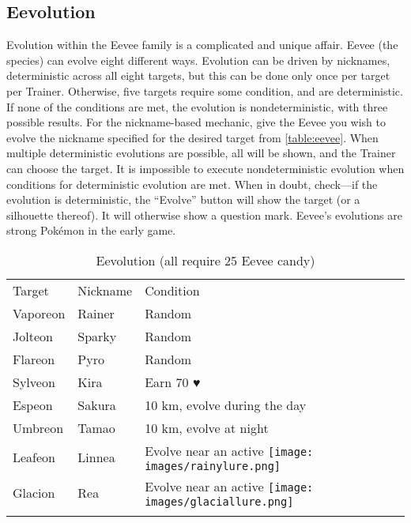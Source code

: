 \subsection{Eevolution}
\begin{figure}
\end{figure}
Evolution within the Eevee family is a complicated and unique affair.
Eevee (the species) can evolve eight different ways.
Evolution can be driven by nicknames, deterministic across all eight targets,
  but this can be done only once per target per Trainer.
Otherwise, five targets require some condition, and are deterministic.
If none of the conditions are met, the evolution is nondeterministic,
  with three possible results.
For the nickname-based mechanic, give the Eevee you wish to evolve the nickname
  specified for the desired target from \autoref{table:eevee}.
When multiple deterministic evolutions are possible, all will be shown,
  and the Trainer can choose the target.
It is impossible to execute nondeterministic evolution when conditions for deterministic evolution are met.
When in doubt, check---if the evolution is deterministic, the ``Evolve'' button will show the target (or a silhouette thereof).
It will otherwise show a question mark.
Eevee's evolutions are strong Pokémon in the early game.
\begin{table}
\centering
\begin{tabular}{lll}
  Target & Nickname & Condition\\
  \Midrule
  Vaporeon & Rainer & Random\\
  Jolteon & Sparky & Random\\
  Flareon & Pyro & Random\\
  Sylveon & Kira & Earn 70 ♥ \\
  Espeon & Sakura & 10 km, evolve during the day\\
  Umbreon & Tamao & 10 km, evolve at night\\
  Leafeon & Linnea & Evolve near an active \texttt{[image: images/rainylure.png]} \\
  Glacion & Rea & Evolve near an active \texttt{[image: images/glaciallure.png]} \\\\
\end{tabular}
\caption{Eevolution (all require 25 Eevee candy)\label{table:eevee}}
\end{table}


